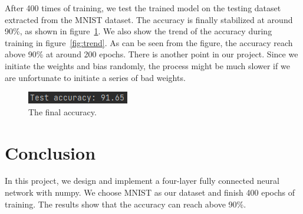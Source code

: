 \documentclass[twoside,twocolumn]{article}
\begin{document}
After 400 times of training, we test the trained model on the testing dataset extracted from the MNIST dataset. The accuracy is finally stabilized at around 90\%, as shown in figure~\ref{fig:accu}. We also show the trend of the accuracy during training in figure~\ref{fig:trend}. As can be seen from the figure, the accuracy reach above 90\% at around 200 epochs. There is another point in our project. Since we initiate the weights and bias randomly, the process might be much slower if we are unfortunate to initiate a series of bad weights.

\begin{figure}[]
	\centering
	\includegraphics[width=0.75\columnwidth, clip=true]{fig/4.png}
	\vspace{-2mm}
	\caption{The final accuracy.}
	\label{fig:accu}
	\vspace{-5mm}
\end{figure}



\section{Conclusion}

In this project, we design and implement a four-layer fully connected neural network with numpy. We choose MNIST as our dataset and finish 400 epochs of training. The results show that the accuracy can reach above 90\%. %






 

\end{document}

